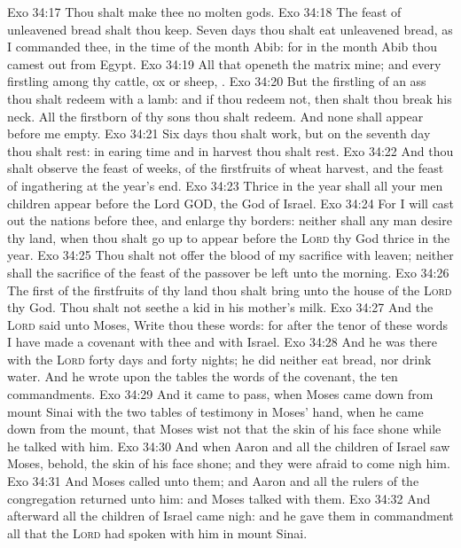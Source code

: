 \vs Exo 34:17 Thou shalt make thee no molten gods.
\vs Exo 34:18 The feast of unleavened bread shalt thou keep. Seven days thou shalt eat unleavened bread, as I commanded thee, in the time of the month Abib: for in the month Abib thou camest out from Egypt.
\vs Exo 34:19 All that openeth the matrix  mine; and every firstling among thy cattle,  ox or sheep, .
\vs Exo 34:20 But the firstling of an ass thou shalt redeem with a lamb: and if thou redeem  not, then shalt thou break his neck. All the firstborn of thy sons thou shalt redeem. And none shall appear before me empty.
\vs Exo 34:21 Six days thou shalt work, but on the seventh day thou shalt rest: in earing time and in harvest thou shalt rest.
\vs Exo 34:22 And thou shalt observe the feast of weeks, of the firstfruits of wheat harvest, and the feast of ingathering at the year's end.
\vs Exo 34:23 Thrice in the year shall all your men children appear before the Lord GOD, the God of Israel.
\vs Exo 34:24 For I will cast out the nations before thee, and enlarge thy borders: neither shall any man desire thy land, when thou shalt go up to appear before the \textsc{Lord} thy God thrice in the year.
\vs Exo 34:25 Thou shalt not offer the blood of my sacrifice with leaven; neither shall the sacrifice of the feast of the passover be left unto the morning.
\vs Exo 34:26 The first of the firstfruits of thy land thou shalt bring unto the house of the \textsc{Lord} thy God. Thou shalt not seethe a kid in his mother's milk.
\vs Exo 34:27 And the \textsc{Lord} said unto Moses, Write thou these words: for after the tenor of these words I have made a covenant with thee and with Israel.
\vs Exo 34:28 And he was there with the \textsc{Lord} forty days and forty nights; he did neither eat bread, nor drink water. And he wrote upon the tables the words of the covenant, the ten commandments.
\vs Exo 34:29 And it came to pass, when Moses came down from mount Sinai with the two tables of testimony in Moses' hand, when he came down from the mount, that Moses wist not that the skin of his face shone while he talked with him.
\vs Exo 34:30 And when Aaron and all the children of Israel saw Moses, behold, the skin of his face shone; and they were afraid to come nigh him.
\vs Exo 34:31 And Moses called unto them; and Aaron and all the rulers of the congregation returned unto him: and Moses talked with them.
\vs Exo 34:32 And afterward all the children of Israel came nigh: and he gave them in commandment all that the \textsc{Lord} had spoken with him in mount Sinai.
